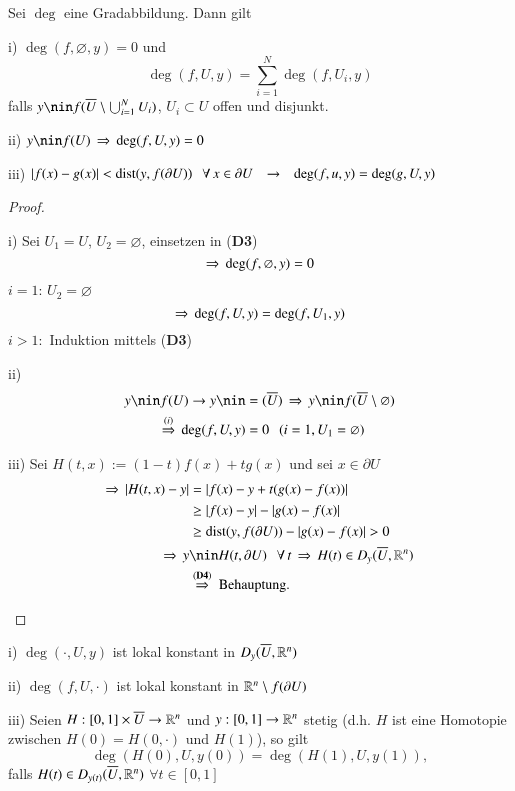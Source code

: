 \begin{theorem}
    Sei $\deg$ eine Gradabbildung. Dann gilt
    \begin{description}
        \item{i)}
        $\deg(f,\varnothing,y)=0$ und
        \[
            \deg(f,U,y)=\sum_{i=1}^N \deg(f,U_i,y)
        \]
        falls $y\nin f(\ol U\setminus\bigcup_{i=1}^NU_i)$, $U_i\subset U$ offen und disjunkt.
        \item{ii)}
        $y\nin f(U) \, \Ra \, \deg(f,U,y)=0$
        \item{iii)}
        $|f(x)-g(x)|<\mathrm{dist}(y,f(\partial U)) \hspace{.25cm} \forall \, x\in \partial U \hspace{.25cm} \rightarrow \hspace{.25cm} \deg(f,u,y)
        =\deg(g,U,y)$
    \end{description}
\end{theorem}

\begin{proof}
    \begin{description}
    \item{i)}
    Sei $U_1=U$, $U_2=\varnothing$, einsetzen in (\textbf{D3})
    \[
        \Rightarrow \, \deg(f,\varnothing,y)=0
    \]
    $i=1$: $U_2=\varnothing$
    \[
        \Rightarrow \, \deg(f,U,y)=\deg(f,U_1,y)
    \]
    $i>1:$ Induktion mittels (\textbf{D3})
    \item{ii)}
    \begin{align*}
        y\nin f(U) \ra y \nin &=(\ol U)\, \Ra \, y\nin f(\ol U\setminus \varnothing)\\
        \overset{(i)}{\Ra } \, \deg (f,U,y)&=0 \qq (i=1, U_1=\varnothing)
    \end{align*}
    \item{iii)}
    Sei $H(t,x):=(1-t)f(x)+tg(x)$ und sei $x\in \partial U$
    \begin{align*}
        \Ra \, |H(t,x)-y|&= |f(x)-y+t(g(x)-f(x))|\\
            &\geq |f(x)-y| - |g(x)-f(x)|\\
            &\geq \dist(y,f(\partial U))- |g(x)-f(x)| >0\\
        \Ra \, y&\nin H(t,\partial U) \qq \forall \, t\,\Ra \,H(t)\in D_y(\ol U,\R^n)\\
        &\overset{(\textbf{D4})}{\Ra} \text{ Behauptung.}
    \end{align*}
    \end{description}
\end{proof}

\begin{theorem}
    \begin{description}
        \item{i)} $\deg(\cdot,U,y)$ ist lokal konstant in $D_y(\overline U,\mathbb{R}^n)$
        \item{ii)} $\deg(f,U,\cdot)$ ist lokal konstant in $\mathbb{R}^n\setminus f(\partial U)$
        \item{iii)} Seien $H:[0,1]\times \overline U\rightarrow \mathbb{R}^n$ und $y:[0,1]\rightarrow \mathbb{R}^n$ stetig (d.h. $H$ ist eine
            Homotopie zwischen $H(0)=H(0,\cdot)$ und $H(1)$), so gilt
        \[
            \deg(H(0),U,y(0))=\deg(H(1),U,y(1)),
        \]
        falls $H(t)\in D_{y(t)}(\overline U, \mathbb{R}^n)$ $\forall t \in [0,1]$
    \end{description}
\end{theorem}

